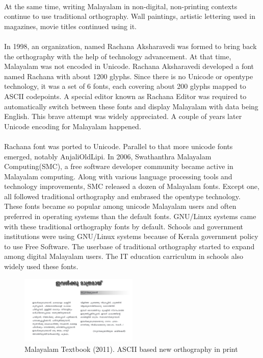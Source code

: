 \documentclass[10pt]{article}
\begin{document}
\paragraph{}
At the same time, writing Malayalam in non-digital, non-printing contexts continue to use traditional orthography. Wall paintings, artistic lettering used in magazines, movie titles continued using it.

\paragraph{}
In 1998, an organization, named Rachana Aksharavedi was formed to bring back the orthography with the help of technology advancement. At that time, Malayalam was not encoded in Unicode. Rachana Aksharavedi developed a font named Rachana with about 1200 glyphs. Since there is no Unicode or opentype technology, it was a set of 6 fonts, each covering about 200 glyphs mapped to ASCII codepoints. A special editor known as Rachana Editor was required to automatically switch between these fonts and display Malayalam with data being English. This brave attempt was widely appreciated. A couple of years later Unicode encoding for Malayalam happened.

\paragraph{}
Rachana font was ported to Unicode. Parallel to that more unicode fonts emerged, notably AnjaliOldLipi. In 2006, Swathanthra Malayalam Computing(SMC), a free software developer community became active in Malayalam computing. Along with various language processing tools and technology improvements, SMC released a dozen of Malayalam fonts. Except one, all followed traditional orthography and embrased the opentype technology. These fonts became so popular among unicode Malayalam users and often preferred in operating systems than the default fonts. GNU/Linux systems came with these traditional orthography fonts by default. Schools and government institutions were using GNU/Linux systems because of Kerala government policy to use Free Software. The userbase of traditional orthography started to expand among digital Malayalam users. The IT education carriculum in schools also widely used these fonts.

\begin{figure}
	\centering
	\includegraphics[width=0.5\textwidth]{images/2011-Malayalam-Textbook.png}
	\caption{Malayalam Textbook (2011). ASCII based new orthography in print}
	\label{textbook2011}
\end{figure}
\end{document}

